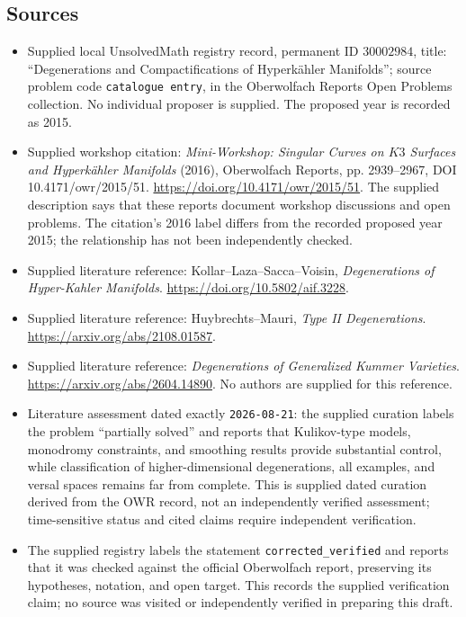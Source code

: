 \documentclass[11pt]{article}
\begin{document}
\subsection{Sources}
\begin{itemize}
\item Supplied local UnsolvedMath registry record, permanent ID \(30002984\), title: ``Degenerations and Compactifications of Hyperkähler Manifolds''; source problem code \texttt{catalogue entry}, in the Oberwolfach Reports Open Problems collection. No individual proposer is supplied. The proposed year is recorded as 2015.
\item Supplied workshop citation: \emph{Mini-Workshop: Singular Curves on \(K3\) Surfaces and Hyperkähler Manifolds} (2016), Oberwolfach Reports, pp. 2939--2967, DOI 10.4171/owr/2015/51. \url{https://doi.org/10.4171/owr/2015/51}. The supplied description says that these reports document workshop discussions and open problems. The citation's 2016 label differs from the recorded proposed year 2015; the relationship has not been independently checked.
\item Supplied literature reference: Kollar--Laza--Sacca--Voisin, \emph{Degenerations of Hyper-Kahler Manifolds}. \url{https://doi.org/10.5802/aif.3228}.
\item Supplied literature reference: Huybrechts--Mauri, \emph{Type II Degenerations}. \url{https://arxiv.org/abs/2108.01587}.
\item Supplied literature reference: \emph{Degenerations of Generalized Kummer Varieties}. \url{https://arxiv.org/abs/2604.14890}. No authors are supplied for this reference.
\item Literature assessment dated exactly \texttt{2026-08-21}: the supplied curation labels the problem ``partially solved'' and reports that Kulikov-type models, monodromy constraints, and smoothing results provide substantial control, while classification of higher-dimensional degenerations, all examples, and versal spaces remains far from complete. This is supplied dated curation derived from the OWR record, not an independently verified assessment; time-sensitive status and cited claims require independent verification.
\item The supplied registry labels the statement \texttt{corrected\_verified} and reports that it was checked against the official Oberwolfach report, preserving its hypotheses, notation, and open target. This records the supplied verification claim; no source was visited or independently verified in preparing this draft.
\end{itemize}
\end{document}
